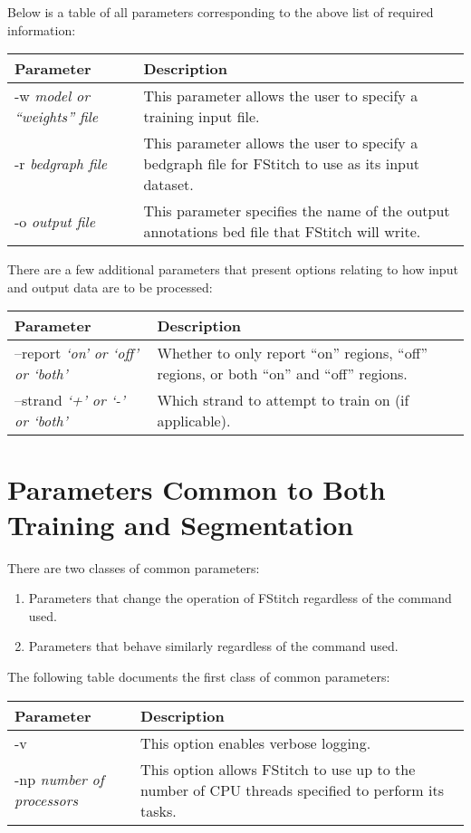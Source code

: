 \documentclass[12pt,letterpaper]{article}
\begin{document}
Below is a table of all parameters corresponding to the above list of required information:

\begin{tabular}{| l | p{8cm} |}
 \hline
 \textbf{Parameter} & \textbf{Description}\\
 \hline
 -w \textit{model or ``weights'' file} & This parameter allows the user to specify a training input file.\\
 \hline
 -r \textit{bedgraph file} & This parameter allows the user to specify a bedgraph file for FStitch to use as its input dataset.\\
 \hline
 -o \textit{output file} & This parameter specifies the name of the output annotations bed file that FStitch will write.\\
 \hline
\end{tabular}

There are a few additional parameters that present options relating to how input and output data are to be processed:

\begin{tabular}{| l | p{8cm} |}
 \hline
 \textbf{Parameter} & \textbf{Description}\\
 \hline
 --report \textit{`on' or `off' or `both'} & Whether to only report ``on'' regions, ``off'' regions, or both ``on'' and ``off'' regions.\\
 \hline
 --strand \textit{`+' or `-' or `both'} & Which strand to attempt to train on (if applicable).\\
 \hline
\end{tabular}

\section{Parameters Common to Both Training and Segmentation}

There are two classes of common parameters:
\begin{enumerate}
 \item Parameters that change the operation of FStitch regardless of the command used.
 \item Parameters that behave similarly regardless of the command used.
\end{enumerate}

The following table documents the first class of common parameters:

\begin{tabular}{| l | p{8cm} |}
 \hline
 \textbf{Parameter} & \textbf{Description}\\
 \hline
 -v & This option enables verbose logging.\\
 \hline
 -np \textit{number of processors} & This option allows FStitch to use up to the number of CPU threads specified to perform its tasks.\\
 \hline
\end{tabular}
\end{document}

